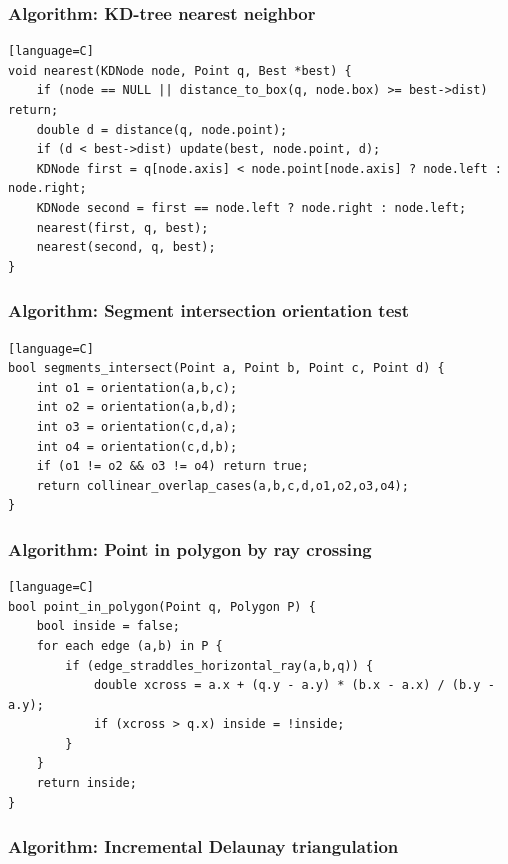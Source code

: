 \documentclass[11pt]{article}
\begin{document}
\subsubsection{Algorithm: KD-tree nearest neighbor}\label{algorithm-kd-tree-nearest-neighbor}

\begin{verbatim}[language=C]
void nearest(KDNode node, Point q, Best *best) {
    if (node == NULL || distance_to_box(q, node.box) >= best->dist) return;
    double d = distance(q, node.point);
    if (d < best->dist) update(best, node.point, d);
    KDNode first = q[node.axis] < node.point[node.axis] ? node.left : node.right;
    KDNode second = first == node.left ? node.right : node.left;
    nearest(first, q, best);
    nearest(second, q, best);
}
\end{verbatim}

\subsubsection{Algorithm: Segment intersection orientation test}\label{algorithm-segment-intersection-orientation-test}

\begin{verbatim}[language=C]
bool segments_intersect(Point a, Point b, Point c, Point d) {
    int o1 = orientation(a,b,c);
    int o2 = orientation(a,b,d);
    int o3 = orientation(c,d,a);
    int o4 = orientation(c,d,b);
    if (o1 != o2 && o3 != o4) return true;
    return collinear_overlap_cases(a,b,c,d,o1,o2,o3,o4);
}
\end{verbatim}

\subsubsection{Algorithm: Point in polygon by ray crossing}\label{algorithm-point-in-polygon-by-ray-crossing}

\begin{verbatim}[language=C]
bool point_in_polygon(Point q, Polygon P) {
    bool inside = false;
    for each edge (a,b) in P {
        if (edge_straddles_horizontal_ray(a,b,q)) {
            double xcross = a.x + (q.y - a.y) * (b.x - a.x) / (b.y - a.y);
            if (xcross > q.x) inside = !inside;
        }
    }
    return inside;
}
\end{verbatim}

\subsubsection{Algorithm: Incremental Delaunay triangulation}\label{algorithm-incremental-delaunay-triangulation}
\end{document}
